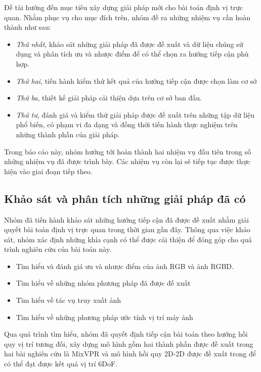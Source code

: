 Đề tài hướng đến mục tiêu xây dựng giải pháp mới cho bài toán định vị trực quan. Nhằm phục vụ cho mục đích trên, nhóm đề ra những nhiệm vụ cần hoàn thành như sau:
\begin{itemize}
    \item \textit{Thứ nhất}, khảo sát những giải pháp đã được đề xuất và dữ liệu chúng sử dụng và phân tích ưu và nhược điểm để có thể chọn ra hướng tiếp cận phù hợp.
    \item \textit{Thứ hai}, tiến hành kiểm thử kết quả của hướng tiếp cận được chọn làm cơ sở
    \item \textit{Thứ ba}, thiết kế giải pháp cải thiện dựa trên cơ sở ban đầu.
    \item \textit{Thứ tư}, đánh giá và kiểm thử giải pháp được đề xuất trên những tập dữ liệu phổ biến, có phạm vi đa dạng và đồng thời tiến hành thực nghiệm trên những thành phần của giải pháp.
\end{itemize}

Trong báo cáo này, nhóm hướng tới hoàn thành hai nhiệm vụ đầu tiên trong số những nhiệm vụ đã được trình bày. Các nhiệm vụ còn lại sẽ tiếp tục được thực hiện vào giai đoạn tiếp theo.

\subsection{Khảo sát và phân tích những giải pháp đã có}
Nhóm đã tiến hành khảo sát những hướng tiếp cận đã được đề xuất nhằm giải quyết bài toán định vị trực quan trong thời gian gần đây. Thông qua việc khảo sát, nhóm xác định những khía cạnh có thể được cải thiện để đóng góp cho quá trình nghiên cứu của bài toán này.
\begin{itemize}
    \item Tìm hiểu và đánh giá ưu và nhược điểm của ảnh RGB và ảnh RGBD.
    \item Tìm hiểu về những nhóm phương pháp đã được đề xuất
    \item Tìm hiểu về tác vụ truy xuất ảnh
    \item Tìm hiểu về những phương pháp ước tính vị trí máy ảnh
\end{itemize}

Qua quá trình tìm hiểu, nhóm đã quyết định tiếp cận bài toán theo hướng hồi quy vị trí tương đối, xây dựng mô hình gồm hai thành phần được đề xuất trong hai bài nghiên cứu là MixVPR \cite{alibey2023mixvpr} và mô hình hồi quy 2D-2D được đề xuất trong \cite{arnold2022mapfree} để có thể đạt được kết quả vị trí 6DoF.

